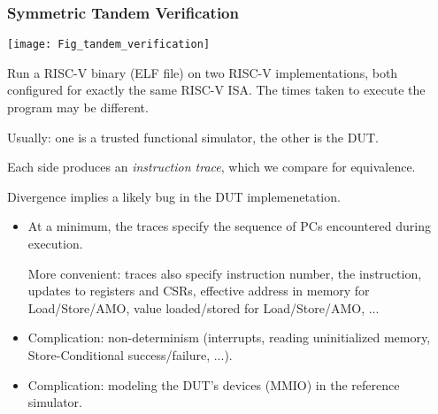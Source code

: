 
\begin{frame}[fragile]
\frametitle{Symmetric Tandem Verification}

\footnotesize

\begin{minipage}{0.6\textwidth}
  \texttt{[image: Fig\_tandem\_verification]}
\end{minipage}
\hfill
\begin{minipage}{0.38\textwidth}
  Run a RISC-V binary (ELF file) on two RISC-V implementations, both
  configured for exactly the same RISC-V ISA.  The times taken to
  execute the program may be different.

  \vx

  Usually: one is a trusted functional simulator, the other is the DUT.

  \vx

  Each side produces an \emph{instruction trace}, which we compare for equivalence.

  \vx

  Divergence implies a likely bug in the DUT implemenetation.

\end{minipage}

\vx

\begin{itemize}
  \item At a minimum, the traces specify the sequence of PCs encountered during execution.

        More convenient: traces also specify instruction number, the
        instruction, updates to registers and CSRs, effective address
        in memory for Load/Store/AMO, value loaded/stored for
        Load/Store/AMO, ...

  \item Complication: non-determinism (interrupts, reading
      uninitialized memory, Store-Conditional success/failure, ...).

  \item Complication: modeling the DUT's devices (MMIO) in the reference simulator.

\end{itemize}

\end{frame}


